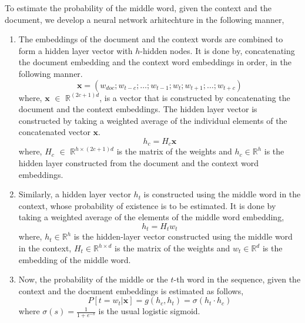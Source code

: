 \documentclass{article}
\begin{document}
To estimate the probability of the middle word, given the context and the document, we develop a neural network arhitechture in the following manner,

\begin{enumerate}
\item The embeddings of the document and the context words are combined to form a hidden layer vector with $h$-hidden nodes. It is done by, concatenating the document embedding and the context word embeddings in order, in the following manner.
\begin{equation}
\textbf{x} = (w_{doc}; w_{t-c}; \ldots; w_{t-1}; w_{t}; w_{t+1}; \ldots; w_{t+c})
\end{equation}
where, $\textbf{x}$ $\in$ $\mathbb{R}^{(2c+1)d}$, is a vector that is constructed by concatenating the document and the context embeddings.
The hidden layer vector is constructed by taking a weighted average of the individual elements of the concatenated vector $\textbf{x}$.
\begin{equation}
\label{eq:hidden_context}
h_{c} = H_{c} \textbf{x}
\end{equation}
where, $H_{c}$ $\in$ $\mathbb{R}^{h \times (2c+1)d}$ is the matrix of the weights and $h_{c} \in \mathbb{R}^{h}$ is the hidden layer constructed from the document and the context word embeddings.

\item Similarly, a hidden layer vector $h_{t}$ is constructed using the middle word in the context, whose probability of existence is to be estimated. It is done by taking a weighted average of the elements of the middle word embedding, 
\begin{equation}
h_{t} = H_{t}w_{t}
\end{equation}
where, $h_{t} \in \mathbb{R}^{h}$ is the hidden-layer vector constructed using the middle word in the context, $H_{t} \in \mathbb{R}^{h \times d}$ is the matrix of the weights and $w_{t} \in \mathbb{R}^{d}$ is the embedding of the middle word.

\item Now, the probability of the middle or the $t$-th word in the sequence, given the context and the document embeddings is estimated as follows, 
\begin{equation}
\label{eq:p_t_wt}
P\left[t=w_{t} | \textbf{x}\right] = g(h_{c}, h_{t}) = \sigma(h_{t}\cdot h_{c}) 
\end{equation}
where $\sigma(s) = \frac{1}{1+e^{-s}}$ is the usual logistic sigmoid.

\end{enumerate}
\end{document}
